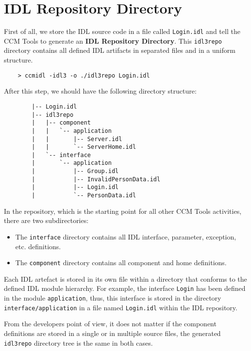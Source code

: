\section{IDL Repository Directory}
\label{section:IdlRepositoryDirectory}

First of all, we store the IDL source code in a file called {\tt Login.idl}
and tell the CCM Tools to generate an {\bf IDL Repository Directory}.
This {\tt idl3repo} directory contains all defined IDL artifacts in separated
files and in a uniform structure.

\begin{verbatim}
	> ccmidl -idl3 -o ./idl3repo Login.idl
\end{verbatim}

After this step, we should have the following directory structure:
\begin{verbatim}
        |-- Login.idl
        |-- idl3repo
        |   |-- component
        |   |   `-- application
        |   |       |-- Server.idl
        |   |       `-- ServerHome.idl
        |   `-- interface
        |       `-- application
        |           |-- Group.idl
        |           |-- InvalidPersonData.idl
        |           |-- Login.idl
        |           `-- PersonData.idl
\end{verbatim}

In the repository, which is the starting point for all other CCM Tools activities,
there are two subdirectories:
\begin{itemize}
 	\item The {\tt interface} directory contains all IDL interface,
 	parameter, exception, etc. definitions.
 	  
  	\item The {\tt component} directory contains all component and
  	home definitions.
\end{itemize}

Each IDL artefact is stored in its own file within a directory that
conforms to the defined IDL module hierarchy.
For example, the interface {\tt Login} has been defined in the module 
{\tt application}, thus, this interface is stored in the directory 
{\tt interface/application} in a file named {\tt Login.idl} within the IDL 
repository.

\vspace{3mm}
From the developers point of view, it does not matter if the component
definitions are stored in a single or in multiple source files, the generated 
{\tt idl3repo} directory tree is the same in both cases.

 \newpage
